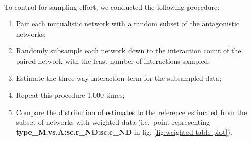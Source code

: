 \documentclass[11pt,]{article}
\providecommand{\tightlist}{%
  \setlength{\itemsep}{0pt}\setlength{\parskip}{0pt}}
\begin{document}
~

To control for sampling effort, we conducted the following procedure:

\begin{enumerate}
\def\labelenumi{\arabic{enumi}.}
\tightlist
\item
  Pair each mutualistic network with a random subset of the antagonistic
  networks;
\item
  Randomly subsample each network down to the interaction count of the
  paired network with the least number of interactions sampled;
\item
  Estimate the three-way interaction term for the subsampled data;
\item
  Repeat this procedure 1,000 times;
\item
  Compare the distribution of estimates to the reference estimated from
  the subset of networks with weighted data (i.e.~point representing
  \textbf{type\_M.vs.A:sc.r\_ND:sc.c\_ND} in fig.
  \ref{fig:weighted-table-plot}).
\end{enumerate}
\end{document}
